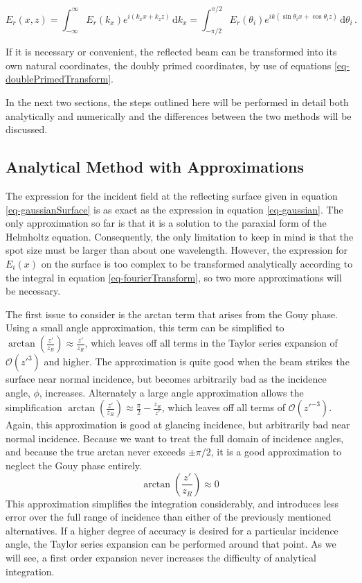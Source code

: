 \documentclass[12pt]{uthesis-v12}
\begin{document}
\begin{equation}\label{eq-inverse-transform}
E_r(x, z) = \int_{-\infty}^\infty E_r(k_x)e^{i(k_xx+k_zz)}\,\mathrm{d}k_x
= \int_{-\pi/2}^{\pi/2} E_r(\theta_i)e^{ik(\sin\theta_ix+\cos\theta_iz)}\,\mathrm{d}\theta_i\,.
\end{equation}

If it is necessary or convenient, the reflected beam can be transformed into its own natural coordinates, the doubly primed coordinates, by use of equations \ref{eq-doublePrimedTransform}.

In the next two sections, the steps outlined here will be performed in detail both analytically and numerically and the differences between the two methods will be discussed.

\subsection{Analytical Method with Approximations}
The expression for the incident field at the reflecting surface given in equation \ref{eq-gaussianSurface} is as exact as the expression in equation \ref{eq-gaussian}. The only approximation so far is that it is a solution to the paraxial form of the Helmholtz equation. Consequently, the only limitation to keep in mind is that the spot size must be larger than about one wavelength. However, the expression for $E_i(x)$ on the surface is too complex to be transformed analytically according to the integral in equation \ref{eq-fourierTransform}, so two more approximations will be necessary.

The first issue to consider is the arctan term that arises from the Gouy phase. Using a small angle approximation, this term can be simplified to $\arctan\left(\frac{z'}{z_R}\right) \approx \frac{z'}{z_R}$, which leaves off all terms in the Taylor series expansion of $\mathcal{O}(z'^3)$ and higher. The approximation is quite good when the beam strikes the surface near normal incidence, but becomes arbitrarily bad as the incidence angle, $\phi$, increases. Alternately a large angle approximation allows the simplification $\arctan\left(\frac{z'}{z_R}\right) \approx \frac{\pi}{2}-\frac{z_R}{z'}$, which leaves off all terms of $\mathcal{O}(z'^{-3})$. Again, this approximation is good at glancing incidence, but arbitrarily bad near normal incidence. Because we want to treat the full domain of incidence angles, and because the true arctan never exceeds $\pm\pi/2$, it is a good approximation to neglect the Gouy phase entirely.
\begin{equation}
\arctan\left(\frac{z'}{z_R}\right) \approx 0
\end{equation}
This approximation simplifies the integration considerably, and introduces less error over the full range of incidence than either of the previously mentioned alternatives.  If a higher degree of accuracy is desired for a particular incidence angle, the Taylor series expansion can be performed around that point. As we will see, a first order expansion never increases the difficulty of analytical integration.
\end{document}
